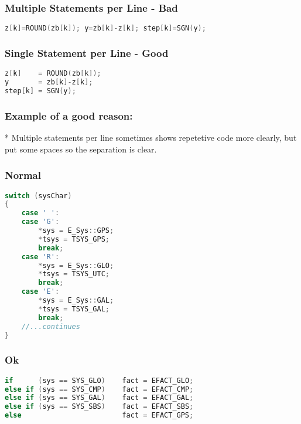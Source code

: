 \subsubsection{Multiple Statements per Line - Bad}
\begin{lstlisting}[language=c++]
z[k]=ROUND(zb[k]); y=zb[k]-z[k]; step[k]=SGN(y);
\end{lstlisting}

\subsubsection{Single Statement per Line - Good}

\begin{lstlisting}[language=c++]
z[k]    = ROUND(zb[k]);
y       = zb[k]-z[k]; 
step[k] = SGN(y);
\end{lstlisting}

\subsubsection{Example of a good reason:}

* Multiple statements per line sometimes shows repetetive code more clearly, but put some spaces so the separation is clear.

\subsubsection{Normal}

\begin{lstlisting}[language=c++]
switch (sysChar)
{
    case ' ':
    case 'G': 
        *sys = E_Sys::GPS; 
        *tsys = TSYS_GPS; 
        break;
    case 'R': 
        *sys = E_Sys::GLO;  
        *tsys = TSYS_UTC; 
        break;
    case 'E': 
        *sys = E_Sys::GAL;  
        *tsys = TSYS_GAL; 
        break;
    //...continues
}
\end{lstlisting}

\subsubsection{Ok}

\begin{lstlisting}[language=c++]
if      (sys == SYS_GLO)    fact = EFACT_GLO;
else if (sys == SYS_CMP)    fact = EFACT_CMP;
else if (sys == SYS_GAL)    fact = EFACT_GAL;
else if (sys == SYS_SBS)    fact = EFACT_SBS;
else                        fact = EFACT_GPS;
\end{lstlisting}

